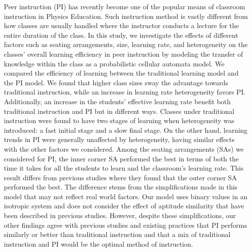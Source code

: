 Peer instruction (PI) has recently become one of the popular means of classroom instruction in Physics Education. 
Such instruction method is vastly different from how classes are usually handled where the instructor conducts a lecture for the entire duration of the class.
In this study, we investigate the effects of different factors such as seating arrangements, size, learning rate, and heterogeneity on the classes' overall learning efficiency in peer instruction by modeling the transfer of knowledge within the class as a probabilistic cellular automata model. 
We compared the efficiency of learning between the traditional learning model and the PI model. 
We found that higher class sizes sway the advantage towards traditional instruction, while an increase in learning rate heterogeneity favors PI.
Additionally, an increase in the students' effective learning rate benefit both traditional instruction and PI but in different ways.
Classes under traditional instruction were found to have two stages of learning when heterogeneity was introduced: a fast initial stage and a slow final stage.
On the other hand, learning trends in PI were generally unaffected by heterogeneity, having similar effects with the other factors we considered.
Among the seating arrangements (SAs) we considered for PI, the inner corner SA performed the best in terms of both the time it takes for all the students to learn and the classroom’s learning rate.
This result differs from previous studies where they found that the outer corner SA performed the best.
The difference stems from the simplifications made in this model that may not reflect real world factors. 
Our model uses binary values in an isotropic system and does not consider the effect of aptitude similarity that have been described in previous studies. 
However, despite these simplifications, our other findings agree with previous studies and existing practices that PI performs similarly or better than traditional instruction and that a mix of traditional instruction and PI would be the optimal method of instruction.

